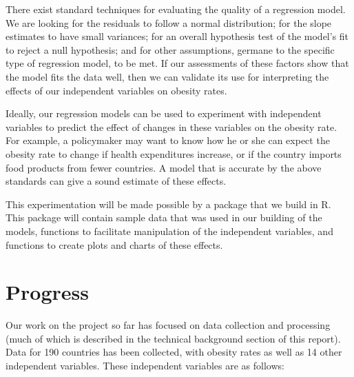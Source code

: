 \documentclass[oneside,12pt]{report}
\begin{document}
There exist standard techniques for evaluating the quality of a regression model. We are looking for the residuals to follow a normal distribution; for the slope estimates to have small variances; for an overall hypothesis test of the model's fit to reject a null hypothesis; and for other assumptions, germane to the specific type of regression model, to be met. If our assessments of these factors show that the model fits the data well, then we can validate its use for interpreting the effects of our independent variables on obesity rates.

Ideally, our regression models can be used to experiment with independent variables to predict the effect of changes in these variables on the obesity rate. For example, a policymaker may want to know how he or she can expect the obesity rate to change if health expenditures increase, or if the country imports food products from fewer countries. A model that is accurate by the above standards can give a sound estimate of these effects.

This experimentation will be made possible by a package that we build in R. This package will contain sample data that was used in our building of the models, functions to facilitate manipulation of the independent variables, and functions to create plots and charts of these effects.

\chapter{Progress}

Our work on the project so far has focused on data collection and processing (much of which is described in the technical background section of this report). Data for 190 countries has been collected, with obesity rates as well as 14 other independent variables. These independent variables are as follows:
\end{document}
